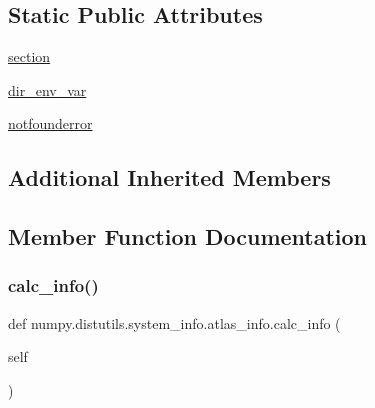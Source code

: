 \subsection*{Static Public Attributes}
\begin{DoxyCompactItemize}
\item 
\hyperlink{classnumpy_1_1distutils_1_1system__info_1_1atlas__info_a783f1730add6eb0d13c309da60175318}{section}
\item 
\hyperlink{classnumpy_1_1distutils_1_1system__info_1_1atlas__info_ab767c412b21adad5a42ff27c07f0f226}{dir\+\_\+env\+\_\+var}
\item 
\hyperlink{classnumpy_1_1distutils_1_1system__info_1_1atlas__info_a4d4a5f821abdfe7c57d84e9c20397f16}{notfounderror}
\end{DoxyCompactItemize}
\subsection*{Additional Inherited Members}


\subsection{Member Function Documentation}
\mbox{\label{classnumpy_1_1distutils_1_1system__info_1_1atlas__info_ae384eb4ce8a413887d8ca571f6a885ef}} 
\subsubsection{\texorpdfstring{calc\+\_\+info()}{calc\_info()}}
{\footnotesize\ttfamily def numpy.\+distutils.\+system\+\_\+info.\+atlas\+\_\+info.\+calc\+\_\+info (\begin{DoxyParamCaption}\item[{}]{self }\end{DoxyParamCaption})}

\mbox{\label{classnumpy_1_1distutils_1_1system__info_1_1atlas__info_a04afec9679feea7af5dde56919ee10d9}} 
